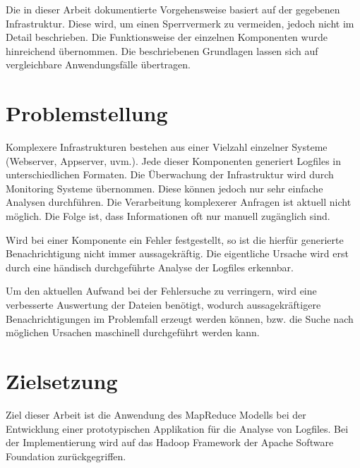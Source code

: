 \newpage
Die in dieser Arbeit dokumentierte Vorgehensweise basiert auf der gegebenen Infrastruktur. Diese wird, um einen Sperrvermerk zu vermeiden, jedoch nicht im Detail beschrieben. Die Funktionsweise der einzelnen Komponenten wurde hinreichend übernommen. Die beschriebenen Grundlagen lassen sich auf vergleichbare Anwendungsfälle übertragen.





\section{Problemstellung}\label{sec:Problemstellung}
Komplexere Infrastrukturen bestehen aus einer Vielzahl einzelner Systeme (Webserver, Appserver, uvm.). Jede dieser Komponenten generiert Logfiles in unterschiedlichen Formaten. Die Überwachung der Infrastruktur wird durch Monitoring Systeme übernommen. Diese können jedoch nur sehr einfache Analysen durchführen. Die Verarbeitung komplexerer Anfragen ist aktuell nicht möglich. Die Folge ist, dass Informationen oft nur manuell zugänglich sind.

Wird bei einer Komponente ein Fehler festgestellt, so ist die hierfür generierte Benachrichtigung nicht immer aussagekräftig. Die eigentliche Ursache wird erst durch eine händisch durchgeführte Analyse der Logfiles erkennbar.

Um den aktuellen Aufwand bei der Fehlersuche zu verringern, wird eine verbesserte Auswertung der Dateien benötigt, wodurch aussagekräftigere Benachrichtigungen im Problemfall erzeugt werden können, bzw. die Suche nach möglichen Ursachen maschinell durchgeführt werden kann.


\section{Zielsetzung}\label{sec:Zielsetzung}
Ziel dieser Arbeit ist die Anwendung des MapReduce Modells bei der Entwicklung einer prototypischen Applikation für die Analyse von Logfiles. Bei der Implementierung wird auf das Hadoop Framework der Apache Software Foundation zurückgegriffen.

